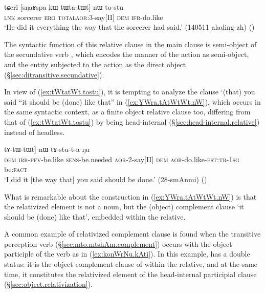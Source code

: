\begin{exe}
\ex \label{ex:tWtatWt.tostu}
\gll tɕeri [sŋaʁspa kɯ tɯ\redp{}ta-tɯt] nɯ to-stu \\
\textsc{lnk} sorcerer \textsc{erg} \textsc{total}\redp{}\textsc{aor}:3\flobv{}-say[II] \textsc{dem} \textsc{ifr}-do.like \\
\glt `He did it everything the way that the sorcerer had said.' (140511 alading-zh)
()
\end{exe} 

The syntactic function of this relative clause in the main clause is semi-object of the secundative verb , which encodes the manner of the action as semi-object, and the entity subjected to the action as the direct object  (§\ref{sec:ditransitive.secundative}). 

In view of (\ref{ex:tWtatWt.tostu}), it is tempting to analyze the clause  `(that) you said ``it should be (done) like that'' in (\ref{ex:YWra.tAtWtWt.nW}), which occurs in the same syntactic context, as a finite object relative clause too, differing from that of (\ref{ex:tWtatWt.tostu}) by being head-internal (§\ref{sec:head-internal.relative}) instead of headless.

\begin{exe}
\ex \label{ex:YWra.tAtWtWt.nW}
\gll [[``\textbf{nɯ} \textbf{a-tɤ-fse} \textbf{ɲɯ-ra}"] tɤ-tɯ-tɯt] nɯ tɤ-stu-t-a ŋu \\
\textsc{dem} \textsc{irr}-\textsc{pfv}-be.like \textsc{sens}-be.needed \textsc{aor}-2-say[II] \textsc{dem} \textsc{aor}-do.like-\textsc{pst}:\textsc{tr}-\textsc{1sg} be:\textsc{fact} \\
\glt `I did it [the way that] you said should be done.' (28-smAnmi)
()
\end{exe} 

What is remarkable about the construction in (\ref{ex:YWra.tAtWtWt.nW}) is that the relativized element is not a noun, but the (object) complement clause  `it should be (done) like that', embedded within the relative. 

A common example of relativized complement clause is found when the transitive perception verb  (§\ref{sec:mto.mtshAm.complement}) occurs with the object participle  of the verb  as in (\ref{ex:konWrNu.kAti}). In this example,  has a double status: it is the object complement clause of  within the relative, and at the same time, it constitutes the relativized element of the head-internal participial clause (§\ref{sec:object.relativization}). 

